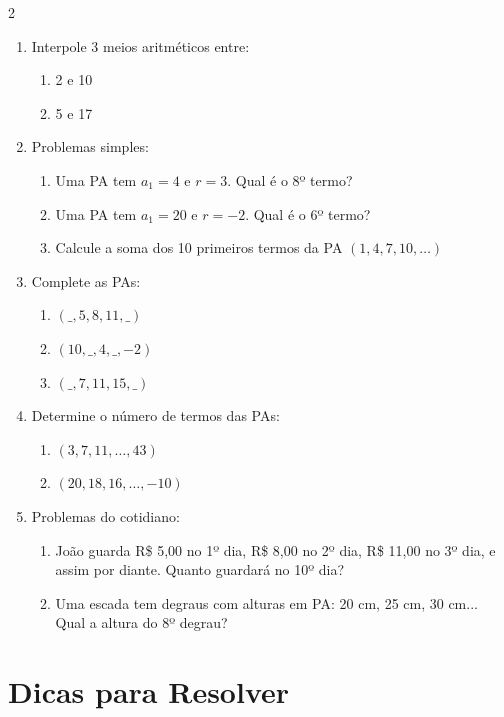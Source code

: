\documentclass[11pt]{article}
\begin{document}
\begin{multicols}{2}
\begin{enumerate}[leftmargin=*]
\item Interpole 3 meios aritméticos entre:
\begin{enumerate}[label=\alph*)]
\item 2 e 10
\item 5 e 17
\end{enumerate}

\item Problemas simples:
\begin{enumerate}[label=\alph*)]
\item Uma PA tem $a_1 = 4$ e $r = 3$. Qual é o 8º termo?
\item Uma PA tem $a_1 = 20$ e $r = -2$. Qual é o 6º termo?
\item Calcule a soma dos 10 primeiros termos da PA $(1, 4, 7, 10, \ldots)$
\end{enumerate}

\item Complete as PAs:
\begin{enumerate}[label=\alph*)]
\item $( \_, 5, 8, 11, \_ )$
\item $(10, \_, 4, \_, -2)$
\item $( \_, 7, 11, 15, \_ )$
\end{enumerate}

\item Determine o número de termos das PAs:
\begin{enumerate}[label=\alph*)]
\item $(3, 7, 11, \ldots, 43)$
\item $(20, 18, 16, \ldots, -10)$
\end{enumerate}

\item Problemas do cotidiano:
\begin{enumerate}[label=\alph*)]
\item João guarda R\$ 5,00 no 1º dia, R\$ 8,00 no 2º dia, R\$ 11,00 no 3º dia, e assim por diante. Quanto guardará no 10º dia?
\item Uma escada tem degraus com alturas em PA: 20 cm, 25 cm, 30 cm... Qual a altura do 8º degrau?
\end{enumerate}

\end{enumerate}

\section*{Dicas para Resolver}


\end{multicols}
\end{document}
